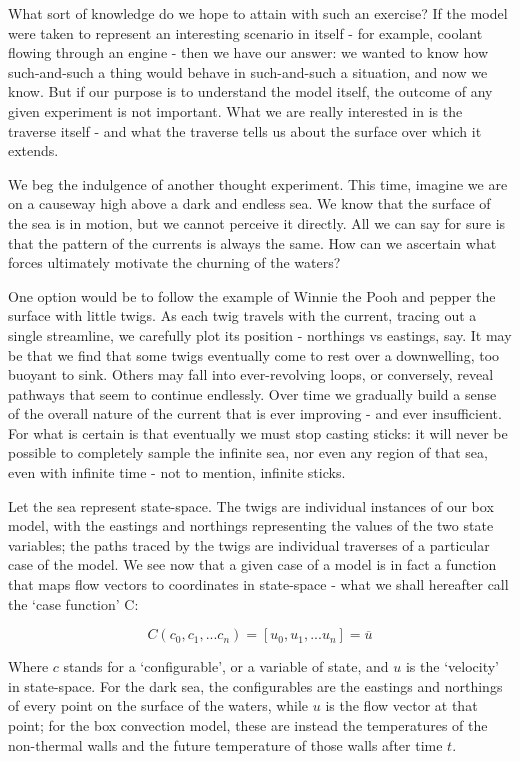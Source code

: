 \documentclass[a4paper,11pt,oneside]{book}
\begin{document}
What sort of knowledge do we hope to attain with such an exercise? If the model were taken to represent an interesting scenario in itself - for example, coolant flowing through an engine - then we have our answer: we wanted to know how such-and-such a thing would behave in such-and-such a situation, and now we know. But if our purpose is to understand the model itself, the outcome of any given experiment is not important. What we are really interested in is the traverse itself - and what the traverse tells us about the surface over which it extends.

We beg the indulgence of another thought experiment. This time, imagine we are on a causeway high above a dark and endless sea. We know that the surface of the sea is in motion, but we cannot perceive it directly. All we can say for sure is that the pattern of the currents is always the same. How can we ascertain what forces ultimately motivate the churning of the waters?

One option would be to follow the example of Winnie the Pooh \cite{Milne1988-ws} and pepper the surface with little twigs. As each twig travels with the current, tracing out a single streamline, we carefully plot its position - northings vs eastings, say. It may be that we find that some twigs eventually come to rest over a downwelling, too buoyant to sink. Others may fall into ever-revolving loops, or conversely, reveal pathways that seem to continue endlessly. Over time we gradually build a sense of the overall nature of the current that is ever improving - and ever insufficient. For what is certain is that eventually we must stop casting sticks: it will never be possible to completely sample the infinite sea, nor even any region of that sea, even with infinite time - not to mention, infinite sticks.

Let the sea represent state-space. The twigs are individual instances of our box model, with the eastings and northings representing the values of the two state variables; the paths traced by the twigs are individual traverses of a particular case of the model. We see now that a given case of a model is in fact a function that maps flow vectors to coordinates in state-space - what we shall hereafter call the `case function' C:

\begin{equation}
C \left( c_0, c_1, ... c_n \right) = \left[ u_0, u_1, ... u_n \right] = \overline{u}
\end{equation}

Where $c$ stands for a `configurable', or a variable of state, and $u$ is the `velocity' in state-space. For the dark sea, the configurables are the eastings and northings of every point on the surface of the waters, while $u$ is the flow vector at that point; for the box convection model, these are instead the temperatures of the non-thermal walls and the future temperature of those walls after time $t$.
\end{document}
